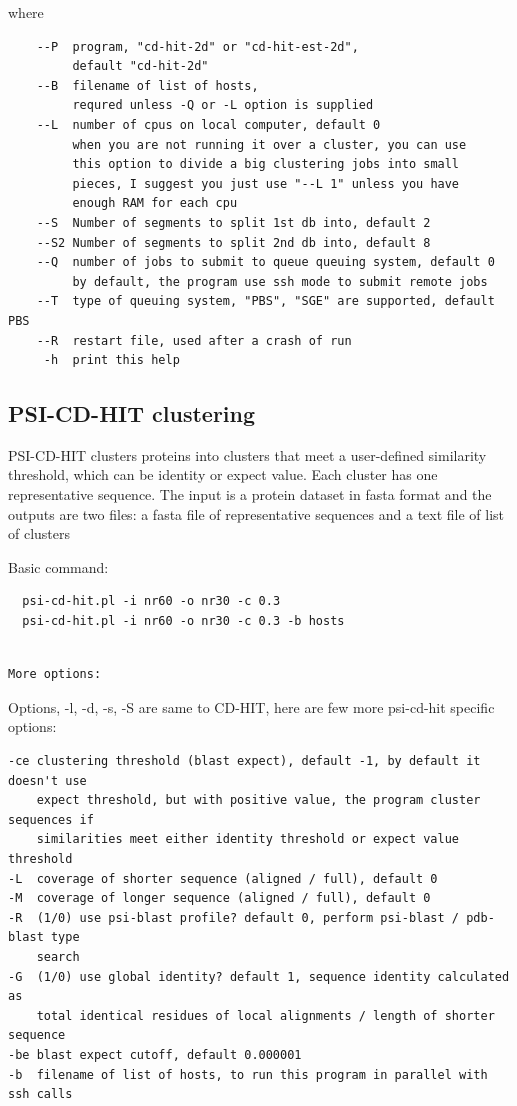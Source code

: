 \documentclass[12pt,a4paper]{article}
\begin{document}
  
where  
\begin{lstlisting}
    --P  program, "cd-hit-2d" or "cd-hit-est-2d",
         default "cd-hit-2d"
    --B  filename of list of hosts,
         requred unless -Q or -L option is supplied
    --L  number of cpus on local computer, default 0
         when you are not running it over a cluster, you can use
         this option to divide a big clustering jobs into small
         pieces, I suggest you just use "--L 1" unless you have
         enough RAM for each cpu
    --S  Number of segments to split 1st db into, default 2
    --S2 Number of segments to split 2nd db into, default 8
    --Q  number of jobs to submit to queue queuing system, default 0
         by default, the program use ssh mode to submit remote jobs
    --T  type of queuing system, "PBS", "SGE" are supported, default PBS
    --R  restart file, used after a crash of run
     -h  print this help
\end{lstlisting}

\subsection{PSI-CD-HIT clustering }

PSI-CD-HIT clusters proteins into clusters that meet a user-defined similarity
threshold, which can be identity or expect value. Each cluster has one
representative sequence. The input is a protein dataset in fasta format and
the outputs are two files: a fasta file of representative sequences and a text
file of list of clusters 

Basic command:

\begin{lstlisting}
  psi-cd-hit.pl -i nr60 -o nr30 -c 0.3
  psi-cd-hit.pl -i nr60 -o nr30 -c 0.3 -b hosts 
\end{lstlisting}

\begin{lstlisting}
 
More options:
\end{lstlisting}

Options, -l, -d, -s, -S are same to CD-HIT, here are few more psi-cd-hit
specific options:
\begin{lstlisting}
-ce clustering threshold (blast expect), default -1, by default it doesn't use
    expect threshold, but with positive value, the program cluster sequences if
    similarities meet either identity threshold or expect value threshold
-L  coverage of shorter sequence (aligned / full), default 0
-M  coverage of longer sequence (aligned / full), default 0
-R  (1/0) use psi-blast profile? default 0, perform psi-blast / pdb-blast type
    search
-G  (1/0) use global identity? default 1, sequence identity calculated as
    total identical residues of local alignments / length of shorter sequence
-be blast expect cutoff, default 0.000001
-b  filename of list of hosts, to run this program in parallel with ssh calls
\end{lstlisting}
\end{document}
